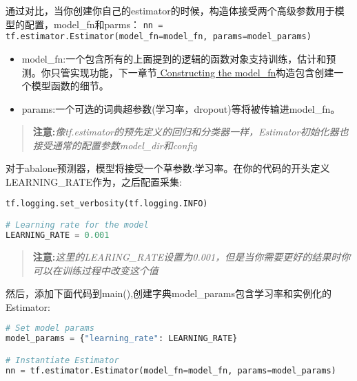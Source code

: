 通过对比，当你创建你自己的estimator的时候，构造体接受两个高级参数用于模型的配置，model\_fn和parms：
\lstinline[language=Python]{nn = tf.estimator.Estimator(model_fn=model_fn, params=model_params)}
\begin{itemize}
\item model\_fn:一个包含所有的上面提到的逻辑的函数对象支持训练，估计和预测。你只管实现功能，下一章节\href{https://www.tensorflow.org/extend/estimators#constructing-modelfn}{ Constructing the model\_fn}构造包含创建一个模型函数的细节。
\item params:一个可选的词典超参数(学习率，dropout)等将被传输进model\_fn。
\end{itemize}
\begin{quote}
\textbf{注意:}\emph{像tf.estimator的预先定义的回归和分类器一样，Estimator初始化器也接受通常的配置参数model\_dir和config}
\end{quote}
对于abalone预测器，模型将接受一个草参数:学习率。在你的代码的开头定义LEARNING\_RATE作为，之后配置采集:
\begin{lstlisting}[language=Python]
tf.logging.set_verbosity(tf.logging.INFO)

# Learning rate for the model
LEARNING_RATE = 0.001
\end{lstlisting}
\begin{quote}
\textbf{注意:}\emph{这里的LEARING\_RATE设置为0.001，但是当你需要更好的结果时你可以在训练过程中改变这个值}
\end{quote}
然后，添加下面代码到main(),创建字典model\_params包含学习率和实例化的Estimator:
\begin{lstlisting}[language=Python]
# Set model params
model_params = {"learning_rate": LEARNING_RATE}

# Instantiate Estimator
nn = tf.estimator.Estimator(model_fn=model_fn, params=model_params)
\end{lstlisting}

